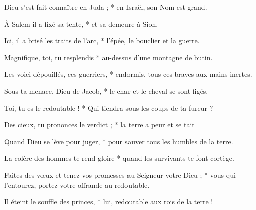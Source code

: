 \item Dieu s'est fait connaître en Juda ; * en Israël, son Nom est grand.
\item À Salem il a fixé sa tente, * et sa demeure à Sion.
\item Ici, il a brisé les traits de l'arc, * l'épée, le bouclier et la guerre.
\item Magnifique, toi, tu resplendis * au-dessus d'une montagne de butin.
\item Les voici dépouillés, ces guerriers, * endormis, tous ces braves aux mains inertes.
\item Sous ta menace, Dieu de Jacob, * le char et le cheval se sont figés.
\item Toi, tu es le redoutable ! * Qui tiendra sous les coups de ta fureur ?
\item Des cieux, tu prononces le verdict ; * la terre a peur et se tait
\item Quand Dieu se lève pour juger, * pour sauver tous les humbles de la terre.
\item La colère des hommes te rend gloire * quand les survivants te font cortège.
\item Faites des vœux et tenez vos promesses au Seigneur votre Dieu ; * vous qui l'entourez, portez votre offrande au redoutable.
\item Il éteint le souffle des princes, * lui, redoutable aux rois de la terre !
